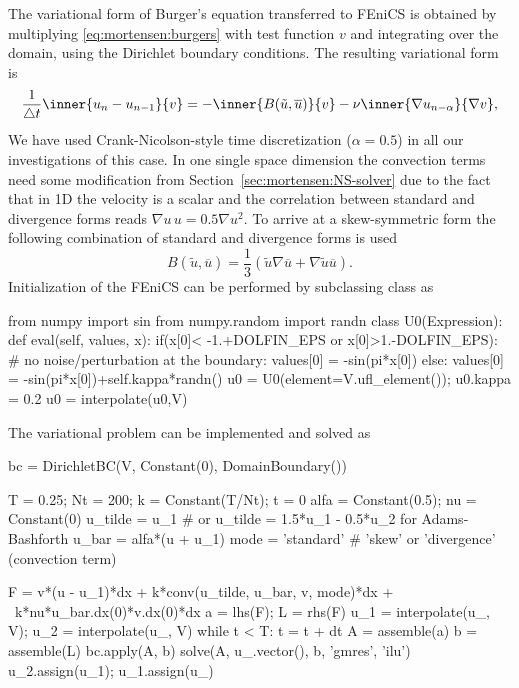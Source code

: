 The variational form of Burger's equation transferred to FEniCS is
obtained by multiplying \eqref{eq:mortensen:burgers} with test
function $v$ and integrating over the domain, using the Dirichlet
boundary conditions. The resulting variational form is
\begin{equation}
 \frac{1}{\triangle t}\inner{ u_{n} - u_{n-1}}{v}
      = - \inner{B(\tilde{u},\overline{u})}{ v }
          - \nu \inner{ \nabla u_{n-\alpha}}{\nabla v },
\label{eq:mortensen:burgers_vf}
\end{equation}
We have used Crank-Nicolson-style time discretization ($\alpha=0.5$)
in all our investigations of this case. In one single space
dimension the convection terms need some modification from
Section~\ref{sec:mortensen:NS-solver} due to the fact that in 1D the
velocity is a scalar and the correlation between standard and divergence
forms reads $\nabla u \, u =0.5 \nabla u^2$. To arrive at a skew-symmetric
form the following combination of standard and divergence forms is used
\begin{equation}
 B(\tilde{u},\overline{u})
    = \frac{1}{3}\left( \tilde{u}\nabla \overline{u}
      + \nabla \tilde{u} \overline{u} \right).
\end{equation}
Initialization of the FEniCS  can be performed by
subclassing class  as
\begin{python}
from numpy import sin
from numpy.random import randn
class U0(Expression):
    def eval(self, values, x):
        if(x[0]< -1.+DOLFIN_EPS or x[0]>1.-DOLFIN_EPS):
            # no noise/perturbation at the boundary:
            values[0] = -sin(pi*x[0])
        else:
            values[0] = -sin(pi*x[0])+self.kappa*randn()
u0 = U0(element=V.ufl_element()); u0.kappa = 0.2
u0 = interpolate(u0,V)
\end{python}
The variational problem can be implemented and solved as
\begin{python}
bc = DirichletBC(V, Constant(0), DomainBoundary())

T = 0.25; Nt = 200; k = Constant(T/Nt); t = 0
alfa = Constant(0.5); nu = Constant(0)
u_tilde = u_1 # or u_tilde = 1.5*u_1 - 0.5*u_2 for Adams-Bashforth
u_bar = alfa*(u + u_1)
mode = 'standard'  # 'skew' or 'divergence' (convection term)

F = v*(u - u_1)*dx + k*conv(u_tilde, u_bar, v, mode)*dx + \
    k*nu*u_bar.dx(0)*v.dx(0)*dx
a = lhs(F); L = rhs(F)
u_1 = interpolate(u_, V); u_2 = interpolate(u_, V)
while t < T:
    t = t + dt
    A = assemble(a)
    b = assemble(L)
    bc.apply(A, b)
    solve(A, u_.vector(), b, 'gmres', 'ilu')
    u_2.assign(u_1); u_1.assign(u_)
\end{python}

